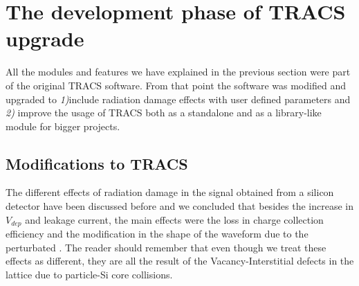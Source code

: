 \section{The development phase of TRACS upgrade} %
\label{sec:devTRACS}

All the modules and features we have explained in the previous section were part of the original TRACS software. From that point the software was modified and upgraded to \emph{1)}include radiation damage effects  with user defined parameters and \emph{2)} improve the usage of TRACS both as a standalone and as a library-like module for bigger projects.



\subsection{Modifications to TRACS}

The different effects of radiation damage in the signal obtained from a silicon detector have been discussed before and we concluded that besides the increase in $V_{dep}$ and leakage current, the main effects were the loss in charge collection efficiency and the modification in the shape of the waveform due to the perturbated \neff. The reader should remember that even though we treat these effects as different, they are all the result of the Vacancy-Interstitial defects in the lattice due to particle-Si core collisions.


